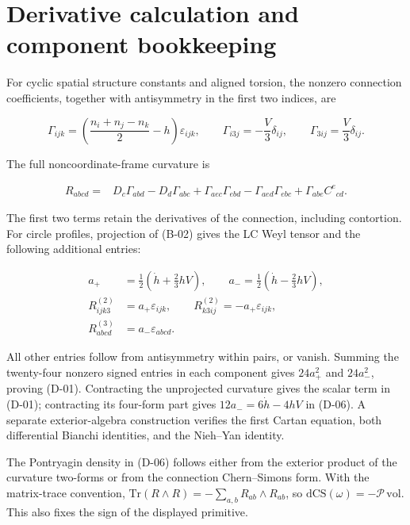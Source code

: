 \section{Derivative calculation and component bookkeeping}

For cyclic spatial structure constants and aligned torsion, the nonzero connection coefficients, together with antisymmetry in the first two indices, are

\begin{equation}\tag{B-01}\label{eq:B-01}
\Gamma_{ijk}=\left(\frac{n_i+n_j-n_k}{2}-h\right)\varepsilon_{ijk},
\qquad \Gamma_{i3j}=-\frac V3\delta_{ij},\qquad
\Gamma_{3ij}=\frac V3\delta_{ij}.
\end{equation}

The full noncoordinate-frame curvature is

\begin{equation}\tag{B-02}\label{eq:B-02}
\begin{aligned}
R_{abcd}={}&D_c\Gamma_{abd}-D_d\Gamma_{abc}
+\Gamma_{aec}\Gamma_{ebd}-\Gamma_{aed}\Gamma_{ebc}
+\Gamma_{abe}C^e{}_{cd}.
\end{aligned}
\end{equation}

The first two terms retain the derivatives of the connection, including contortion. For circle profiles, projection of (B-02) gives the LC Weyl tensor and the following additional entries:

\begin{equation}\tag{B-03}\label{eq:B-03}
\begin{aligned}
a_+&=\tfrac12\left(\dot h+\tfrac23hV\right),\qquad
a_-=\tfrac12\left(\dot h-\tfrac23hV\right),\\
R^{(2)}_{ijk3}&=a_+\varepsilon_{ijk},\qquad
R^{(2)}_{k3ij}=-a_+\varepsilon_{ijk},\\
R^{(3)}_{abcd}&=a_-\varepsilon_{abcd}.
\end{aligned}
\end{equation}

All other entries follow from antisymmetry within pairs, or vanish. Summing the twenty-four nonzero signed entries in each component gives $24a_+^2$ and $24a_-^2$, proving (D-01). Contracting the unprojected curvature gives the scalar term in (D-01); contracting its four-form part gives $12a_-=6\dot h-4hV$ in (D-06). A separate exterior-algebra construction verifies the first Cartan equation, both differential Bianchi identities, and the Nieh--Yan identity.

The Pontryagin density in (D-06) follows either from the exterior product of the curvature two-forms or from the connection Chern--Simons form. With the matrix-trace convention, $\mathrm{Tr}(R\wedge R)=-\sum_{a,b}R_{ab}\wedge R_{ab}$, so $\mathrm{d}\mathrm{CS}(\omega)=-\mathcal P\,\mathrm{vol}$. This also fixes the sign of the displayed primitive.

